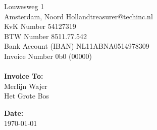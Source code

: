 \documentclass{invoice} %
\def \tab {\hspace*{3ex}} %
\begin{document}
\hspace{-23em}
Louwesweg 1 \\ %
Amsterdam, Noord Holland\hfill treasurer@techinc.nl \\
KvK Number \hfill 54127319 \\
BTW Number \hfill 8511.77.542  \\
Bank Account (IBAN) \hfill NL11ABNA0514978309 \\
Invoice Number \hfill 0b0 (00000)
\\ \\
{\bf Invoice To:} \\
\tab Merlijn Wajer \\
\tab Het Grote Bos

{\bf Date:} \\
\tab \today \\

\begin{invoiceTable}



\end{invoiceTable}

\end{document}
